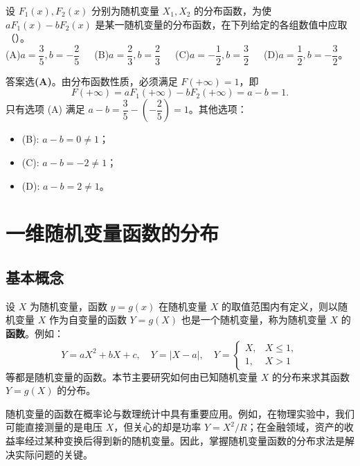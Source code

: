 ﻿\documentclass[lang=cn,11pt]{elegantbook}
\begin{document}
\begin{exercise}[分布函数线性组合]
设 $F_1(x),F_2(x)$ 分别为随机变量 $X_1,X_2$ 的分布函数，为使 $aF_1(x)-bF_2(x)$ 是某一随机变量的分布函数，在下列给定的各组数值中应取（\quad）。\\
(A)$a=\dfrac{3}{5}, b=-\dfrac{2}{5}$~~~(B)$a=\dfrac{2}{3}, b=\dfrac{2}{3}$~~~(C)$a=-\dfrac{1}{2}, b=\dfrac{3}{2}$~~~(D)$a=\dfrac{1}{2}, b=-\dfrac{3}{2}$。
\end{exercise}
\begin{solution}
答案选\textbf{(A)}。由分布函数性质，必须满足 $F(+\infty)=1$，即
\[
F(+\infty)=aF_1(+\infty)-bF_2(+\infty)=a-b=1.
\]
只有选项 (A) 满足 $a-b=\dfrac{3}{5}-\left(-\dfrac{2}{5}\right)=1$。其他选项：
\begin{itemize}
    \item (B): $a-b=0\neq1$；
    \item (C): $a-b=-2\neq1$；
    \item (D): $a-b=2\neq1$。
\end{itemize}
\end{solution}





\section{一维随机变量函数的分布} \label{sec:random-variable-function}

\subsection{基本概念} \label{subsec:function-concept}

设 $X$ 为随机变量，函数 $y = g(x)$ 在随机变量 $X$ 的取值范围内有定义，则以随机变量 $X$ 作为自变量的函数 $Y = g(X)$ 也是一个随机变量，称为随机变量 $X$ 的\textbf{函数}。例如：
\[
Y = aX^2 + bX + c,\quad Y = |X-a|,\quad Y = \begin{cases} X, & X \le 1, \\ 1, & X > 1 \end{cases}
\]
等都是随机变量的函数。本节主要研究如何由已知随机变量 $X$ 的分布来求其函数 $Y = g(X)$ 的分布。

\begin{note}
随机变量的函数在概率论与数理统计中具有重要应用。例如，在物理实验中，我们可能直接测量的是电压 $X$，但关心的却是功率 $Y = X^2/R$；在金融领域，资产的收益率经过某种变换后得到新的随机变量。因此，掌握随机变量函数的分布求法是解决实际问题的关键。
\end{note}
\end{document}
